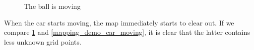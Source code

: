 \begin{figure}[!ht]
    \centering
    \caption{The ball is moving}
    \label{mapping_demo_ball_moving}
\end{figure}

When the car starts moving, the map immediately starts to clear out. If we compare \ref{mapping_demo_ball_moving} and \ref{mapping_demo_car_moving}, it is clear that the latter contains less unknown grid points.

